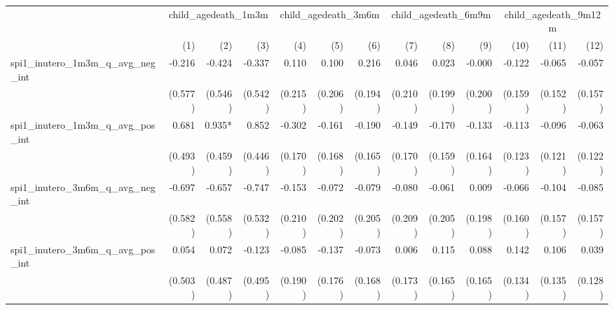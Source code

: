 \begin{tabular}{lrrrrrrrrrrrr}
\toprule
                                            &  \multicolumn{3}{c}{child\_agedeath\_1m3m} &  \multicolumn{3}{c}{child\_agedeath\_3m6m} &  \multicolumn{3}{c}{child\_agedeath\_6m9m} & \multicolumn{3}{c}{child\_agedeath\_9m12m} \\ 
\cmidrule(lr){2-4} \cmidrule(lr){5-7} \cmidrule(lr){8-10} \cmidrule(lr){11-13} 
                                            &          (1) &          (2) &          (3) &          (4) &          (5) &          (6) &          (7) &          (8) &          (9) &         (10) &         (11) &         (12) \\ 
\midrule
spi1\_inutero\_1m3m\_q\_avg\_neg\_int       &       -0.216 &       -0.424 &       -0.337 &        0.110 &        0.100 &        0.216 &        0.046 &        0.023 &       -0.000 &       -0.122 &       -0.065 &       -0.057 \\ 
                                            &      (0.577) &      (0.546) &      (0.542) &      (0.215) &      (0.206) &      (0.194) &      (0.210) &      (0.199) &      (0.200) &      (0.159) &      (0.152) &      (0.157) \\ 
spi1\_inutero\_1m3m\_q\_avg\_pos\_int       &        0.681 &       0.935* &        0.852 &       -0.302 &       -0.161 &       -0.190 &       -0.149 &       -0.170 &       -0.133 &       -0.113 &       -0.096 &       -0.063 \\ 
                                            &      (0.493) &      (0.459) &      (0.446) &      (0.170) &      (0.168) &      (0.165) &      (0.170) &      (0.159) &      (0.164) &      (0.123) &      (0.121) &      (0.122) \\ 
spi1\_inutero\_3m6m\_q\_avg\_neg\_int       &       -0.697 &       -0.657 &       -0.747 &       -0.153 &       -0.072 &       -0.079 &       -0.080 &       -0.061 &        0.009 &       -0.066 &       -0.104 &       -0.085 \\ 
                                            &      (0.582) &      (0.558) &      (0.532) &      (0.210) &      (0.202) &      (0.205) &      (0.209) &      (0.205) &      (0.198) &      (0.160) &      (0.157) &      (0.157) \\ 
spi1\_inutero\_3m6m\_q\_avg\_pos\_int       &        0.054 &        0.072 &       -0.123 &       -0.085 &       -0.137 &       -0.073 &        0.006 &        0.115 &        0.088 &        0.142 &        0.106 &        0.039 \\ 
                                            &      (0.503) &      (0.487) &      (0.495) &      (0.190) &      (0.176) &      (0.168) &      (0.173) &      (0.165) &      (0.165) &      (0.134) &      (0.135) &      (0.128) \\ 

\end{tabular}
